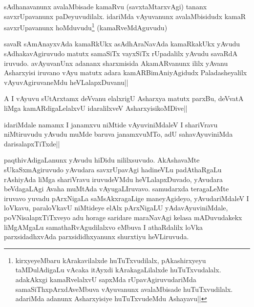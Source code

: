 
\begin{artha}
sAdhanavanunx avalaMbisade kamaRvu (savxtaMtarxvAgi) tananx savxrUpavanunx paDeyuvudilalx. idariMda vAyuvanunx avalaMbisidudx kamaR savxrUpavanunx hoMduvudu\footnote[2]{kirxyeyeMbaru kArakavilalxde huTuTxvudilalx, pAkashirxyeyu taMDulAdigaLu vAcaka itAyxdi kArakagaLilalxde huTuTxvudalalx. adakAkxgi kamaRvelalxvU sapxMda rUpavAgiruvudariMda samaSiThxpArxdAveMbuva vAyuvanunx avalaMbisade huTuTxvudilalx. adariMda adanunx Asharxyisiye huTuTxvudeMdu Ashayavu||} (kamaRveMdAguvudu)
\end{artha}


\begin{artha}
\stext savaR sAmAnayxvAda kamaRkUkx asAdhAraNavAda kamaRkakUkx yAvudu sAdhakavAgiruvudo matutx samaSiTx vayxSiTx rUpadalilx yAvudu savaRdA iruvudo. avAyuvanUnx adananx sharxmisida AkamARvanunx ililx yAvanu Asharxyisi iruvano vAyu matutx adara kamARBimAniyAgidudx Paladasheyalilx vAyuvAgiruvaneMdu heVLalapxDuvanu||
\end{artha}


\begin{artha}
A I vAyuvu sUtArxtamx deVvanu elalxrigU Asharxya matutx parxBu, deVvatA liMga kamARdigaLelalxvU idaralilxveV AsharxyisikoMDive||
\end{artha}


\begin{artha}
idariMdale namamx I janamxvu niMtide vAyuviniMdaleV I shariVravu niMtiruvudu yAvudu muMde baruva janamxvuMTo, adU sahavAyuviniMda darisalapxTiTxde||
\end{artha}

\begin{artha}%
paqthivAdigaLanunx yAvudu hiDidu nililxsuvudo. AkAshavaMte sUkaSxmAgiruvudo yAvudara savxrUpavAgi hadineVLu padAthaRgaLu rAshiyAda liMga shariVravu iruvudeVMdu heVLalapxDuvado, yAvudara beVdagaLAgi Avaha muMtAda vAyugaLIruvavo. samudarxda teragaLeMte iruvavo yuvadu pArxNigaLa saMsAkxragaLige maneyAgideyo, yAvudariMdaleV I loVkavu, paraloVkavU niMtideye elAlx pArxNigaLU yAdavAyuviniMdale, poVNisalapxTiTxveyo adu horage saridare maraNavAgi kelasa mADuvudakekx liMgAMgaLu samathaRvAgudilalxvo eMbuva I athaRdalilx loVka parxsidadhxvAda parxsididhxyanunx shurxtiyu heVLiruvuda. 
\end{artha}

